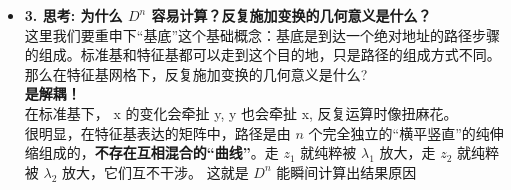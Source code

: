 \documentclass[12pt]{article}
\begin{document}
\begin{flushleft}
\begin{itemize}
        \item \textbf{3. 思考: 为什么 $D^{n}$ 容易计算？反复施加变换的几何意义是什么？} \\
              这里我们要重申下“基底”这个基础概念：基底是到达一个绝对地址的路径步骤的组成。标准基和特征基都可以走到这个目的地，只是路径的组成方式不同。\\
              那么在特征基网格下，反复施加变换的几何意义是什么?\\
              \textbf{是解耦！}\\
              在标准基下， x 的变化会牵扯 y, y 也会牵扯 x, 反复运算时像扭麻花。\\
              很明显，在特征基表达的矩阵中，路径是由 $n$ 个完全独立的“横平竖直”的纯伸缩组成的，\textbf{不存在互相混合的“曲线”}。走 $z_1$ 就纯粹被 $\lambda_1$ 放大，走 $z_2$ 就纯粹被 $\lambda_2$ 放大，它们互不干涉。
              这就是 $D^n$ 能瞬间计算出结果原因

    \end{itemize}
\end{flushleft}
\end{document}
